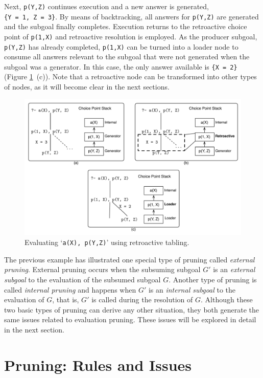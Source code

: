 Next, \texttt{p(Y,Z)} continues execution and a new answer is generated, \texttt{\{Y~=~1,~Z~=~3\}}.
By means of backtracking, all answers for \texttt{p(Y,Z)} are generated and the subgoal finally completes.
Execution returns to the retroactive choice point of \texttt{p(1,X)} and retroactive resolution is employed.
As the producer subgoal, \texttt{p(Y,Z)} has already completed, \texttt{p(1,X)} can be turned into a loader
node to consume all answers relevant to the subgoal that were not generated when the subgoal was a generator.
In this case, the only answer available is \texttt{\{X~=~2\}} (Figure \ref{fig:retro_eval1}~(c)).
Note that a retroactive node can be transformed into other types of nodes, as it will become clear in the next
sections.

\begin{figure}[ht]
  \centering
    \includegraphics[scale=0.6]{pruning_example1.pdf}
  \caption{Evaluating `\texttt{a(X),~p(Y,Z)}' using retroactive tabling.}
  \label{fig:retro_eval1}
\end{figure}

The previous example has illustrated one special type of pruning called \textit{external pruning}.
External pruning occurs when the subsuming subgoal $G'$ is an \textit{external subgoal} to the evaluation
of the subsumed subgoal $G$. Another type of pruning is called \textit{internal pruning} and happens
when $G'$ is an \textit{internal subgoal} to the evaluation of $G$, that is, $G'$ is called
during the resolution of $G$. Although these two basic types of pruning can derive any other
situation, they both generate the same issues related to evaluation pruning. These issues will be explored
in detail in the next section.

\section{Pruning: Rules and Issues}

